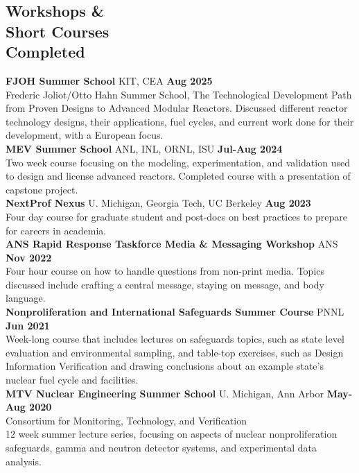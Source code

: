 \documentclass[margin,line]{resume}
\begin{document}
\begin{resume}
    \section{\mysidestyle Workshops \&\\Short Courses\\Completed}
    \textbf{FJOH Summer School} KIT, CEA \hfill \textbf{Aug 2025}\\
    Frederic Joliot/Otto Hahn Summer School, The Technological Development 
    Path from Proven Designs to Advanced Modular Reactors. Discussed 
    different reactor technology designs, their applications, fuel cycles, and 
    current work done for their development, with a European focus. \\
    \textbf{MEV Summer School} ANL, INL, ORNL, ISU \hfill \textbf{Jul-Aug 2024}\\
    Two week course focusing on the modeling, experimentation, and 
    validation used to design and license advanced reactors. Completed 
    course with a presentation of capstone project. \\
    \textbf{NextProf Nexus} 
    U. Michigan, Georgia Tech, UC Berkeley \hfill \textbf{Aug 2023}\\
    Four day course for graduate student and post-docs on best practices to prepare for careers in 
    academia. \\
    \textbf{ANS Rapid Response Taskforce Media \& Messaging Workshop} 
    ANS \hfill \textbf{Nov 2022}\\
    Four hour course on how to handle questions from non-print media. Topics discussed 
    include crafting a central message, staying on message, and body language. \\
    \textbf{Nonproliferation and International Safeguards Summer Course} 
    PNNL \hfill \textbf{Jun 2021} \\
    Week-long course that includes lectures on safeguards topics, such as state level evaluation
    and environmental sampling, and table-top exercises, such as Design Information 
    Verification and drawing conclusions about an example state's nuclear  fuel cycle and 
    facilities. \\
    \textbf{MTV Nuclear Engineering Summer School} 
    U. Michigan, Ann Arbor \hfill \textbf{May-Aug 2020} \\
    Consortium for Monitoring, Technology, and Verification\\
    12 week summer lecture series, focusing on aspects of nuclear nonproliferation safeguards, gamma and neutron detector systems, and experimental data analysis. \\

\end{resume}
\end{document}
